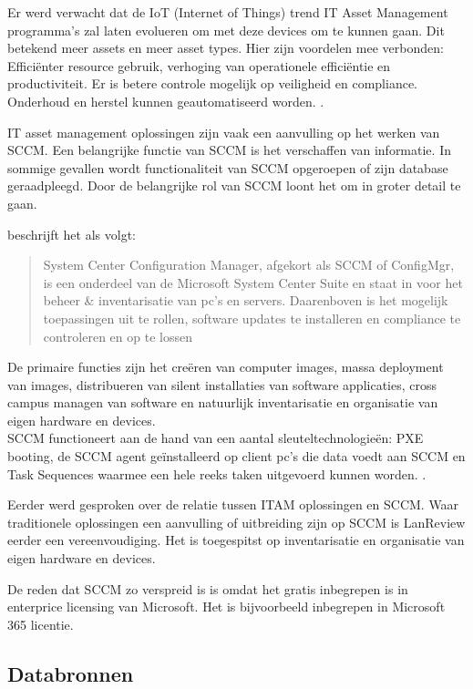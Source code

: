 Er werd verwacht dat de IoT (Internet of Things) trend IT Asset Management programma's zal laten evolueren om met deze devices om te kunnen gaan. Dit betekend meer assets en meer asset types. Hier zijn voordelen mee verbonden: Efficiënter resource gebruik, verhoging van operationele efficiëntie en productiviteit. Er is betere controle mogelijk op veiligheid en compliance. Onderhoud en herstel kunnen geautomatiseerd worden. \autocite{Badnakhe2020}.

IT asset management oplossingen zijn vaak een aanvulling op het werken van SCCM. Een belangrijke functie van SCCM is het verschaffen van informatie. In sommige gevallen wordt functionaliteit van SCCM opgeroepen of zijn database geraadpleegd. Door de belangrijke rol van SCCM loont het om in groter detail te gaan.

\textcite{Droogenbroot2016} beschrijft het als volgt:
\begin{quote}
    System Center Configuration Manager, afgekort als SCCM of ConfigMgr, is een onderdeel van de Microsoft System Center Suite en staat in voor het beheer \& inventarisatie van pc's en servers. Daarenboven is het mogelijk toepassingen uit te rollen, software updates te installeren en compliance te controleren en op te lossen
\end{quote}

De primaire functies zijn het creëren van computer images, massa deployment van images, distribueren van silent installaties van software applicaties, cross campus managen van software en natuurlijk inventarisatie en organisatie van eigen hardware en devices.\\
SCCM functioneert aan de hand van een aantal sleuteltechnologieën: PXE booting, de SCCM agent geïnstalleerd op client pc's die data voedt aan SCCM en Task Sequences waarmee een hele reeks taken uitgevoerd kunnen worden. \autocite{Spitze2019}.

Eerder werd gesproken over de relatie tussen ITAM oplossingen en SCCM. Waar traditionele oplossingen een aanvulling of uitbreiding zijn op SCCM is LanReview eerder een vereenvoudiging. Het is toegespitst op inventarisatie en organisatie van eigen hardware en devices.

De reden dat SCCM zo verspreid is is omdat het gratis inbegrepen is in enterprice licensing van Microsoft. Het is bijvoorbeeld inbegrepen in Microsoft 365 licentie. \autocite{MicrosoftDocs2020}

\subsection{Databronnen}

